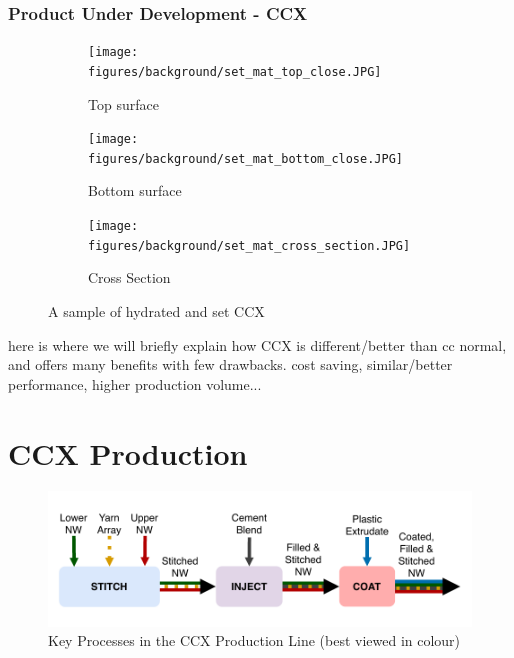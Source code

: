 \documentclass[12pt]{report}
\begin{document}
    \subsubsection{Product Under Development - CCX}
    \begin{figure}[ht]
    \begin{subfigure}{.5\textwidth}
        \centering
        \texttt{[image: figures/background/set\_mat\_top\_close.JPG]}  
        \caption{Top surface}
        \label{fig:ccx_set_top}
    \end{subfigure}
    \begin{subfigure}{.5\textwidth}
        \centering
        \texttt{[image: figures/background/set\_mat\_bottom\_close.JPG]}  
        \caption{Bottom surface}
        \label{fig:ccx_set_bottom}
    \end{subfigure}
    \newline
    \begin{subfigure}{\textwidth}
        \centering
        \texttt{[image: figures/background/set\_mat\_cross\_section.JPG]}  
        \caption{Cross Section}
        \label{fig:ccx_set_cross}
    \end{subfigure}
    \caption{A sample of hydrated and set CCX}
    \label{fig:ccx_set_sample}
    \end{figure}
    
    here is where we will briefly explain how CCX is different/better than cc normal, and offers many benefits with few drawbacks. cost saving, similar/better performance, higher production volume...
    \pagebreak
    \section{CCX Production}
            
        \begin{figure}
            \centering
            \includegraphics[width=\textwidth]{figures/background/process_flow_overview.pdf}
            \caption{Key Processes in the CCX Production Line (best viewed in colour)}
            \label{fig:process_flow_overview}
        \end{figure}
        
\end{document}
